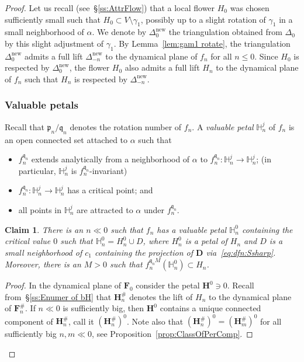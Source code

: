 \documentclass[]{amsart}
\newcommand{\bDelta}{{\mathbb{\Delta}}}
\newcommand{\bF}{{\mathbf F}}
\newcommand{\bD}{{\mathbf D}}
\newcommand{\bH}{{\mathbf H}}
\newcommand{\fH}{{\mathbb H}}
\newcommand{\pp}{\mathfrak{p}}
\renewcommand{\qq}{\mathfrak{q}}
\newcommand\new{{\operatorname{new}}}
\newtheorem{claim3}{Claim}
\theoremstyle{remark}
\numberwithin{equation}{section}
\theoremstyle{definition}
\begin{document}
\begin{proof}
Let us recall (see~\S\ref{ss:AttrFlow}) that a local flower $H_{0}$ was chosen sufficiently small such that $H_{0}\subset V\setminus \gamma_1$, possibly up to a slight rotation of $\gamma_1$ in a small neighborhood of $\alpha$. We denote by $\bDelta_0^\new$ the triangulation obtained from $\bDelta_0$ by this slight adjustment of $\gamma_1$.  By Lemma~\ref{lem:gam1 rotate}, the triangulation $\bDelta_0^\new$ admits a full lift $\bDelta_{-n}^\new$ to the dynamical plane of $f_n$ for all $n\le0$. Since $H_0$ is respected by $\bDelta_0^\new$, the flower $H_0$ also admits a full lift $H_n$ to the dynamical plane of $f_n$ such that $H_n$ is respected by $\bDelta^\new_{-n}$.


\subsubsection{Valuable petals} Recall that $\pp_n/\qq_n$ denotes the rotation number of $f_n$. A \emph{valuable petal} $\fH^j_n$ of $f_n$ is an open connected set attached to $\alpha$ such that
\begin{itemize}
\item $f_n^{\qq_n}$ extends analytically from a neighborhood of $\alpha$ to $f_n^{\qq_n}\colon \fH^j_n\to \fH^j_n$; (in particular, $\fH^j_n$ is  $f^{\qq_n}_n$-invariant)
\item  $f_n^{\qq_n}\colon \fH^j_n\to \fH^j_n$ has a critical point; and
\item all points in $\fH^j_n$ are attracted to $\alpha$ under $f_n^{\qq_n}$.
\end{itemize}





\begin{claim3}
\label{cl3:ValPetalExists}
There is an $n\ll 0$ such that $f_n$ has a valuable petal $\fH^0_n$ containing the critical value $0$ such that $\fH^0_n = H_n^0\cup D$, where $H_n^0$ is a petal of $H_n$ and $D$ is a small neighborhood of $c_1$ containing the projection of $\bD$ via~\eqref{eq:dfn:Ssharp}. Moreover, there is an $M>0$ such that $f^{\qq_nM}_n(\fH^0_n)\subset H_n$.
\end{claim3}
\begin{proof}
In the dynamical plane of $\bF_0$ consider the petal $\bH^0\ni 0$. Recall from~\S\ref{ss:Enumer of bH} that $\bH^\#_n$ denotes the lift of $H_n$ to the dynamical plane of $\bF^{\#}_n$. If $n\ll 0$ is sufficiently big, then $\bH^0$ contains a unique connected component of $\bH^\#_n$, call it $(\bH_n^\#)^0$. Note also that $(\bH_n^\#)^0= (\bH_m^\#)^0$ for all sufficiently big $n,m\ll 0$, see Proposition~\ref{prop:ClassOfPerComp}.



\end{proof}
\end{proof}
\end{document}
